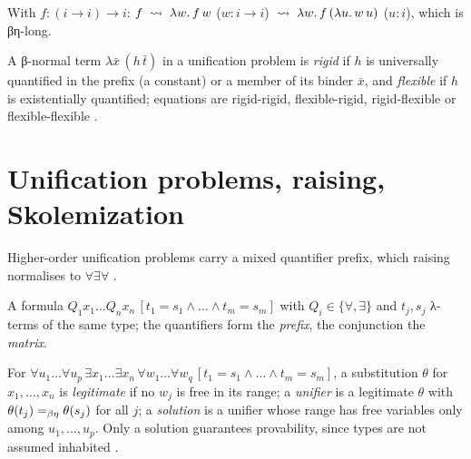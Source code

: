 \begin{example}
With $f:(i\to i)\to i$: $f \;\rightsquigarrow\; \lambda w.\,f\,w$ ($w:i\to i$) $\;\rightsquigarrow\; \lambda w.\,f\,(\lambda u.\,w\,u)$ ($u:i$), which is βη-long.
\end{example}

\begin{definition}\label{def:rules-rigid}
A β-normal term $\lambda\bar x\,(h\,\bar t)$ in a unification problem is \emph{rigid} if $h$ is universally quantified in the prefix (a constant) or a member of its binder $\bar x$, and \emph{flexible} if $h$ is existentially quantified; equations are rigid-rigid, flexible-rigid, rigid-flexible or flexible-flexible .
\end{definition}

\section{Unification problems, raising, Skolemization}\label{sec:rules-raising}

Higher-order unification problems carry a mixed quantifier prefix, which raising normalises to $\forall\exists\forall$ .

\begin{definition}\label{def:rules-problem}
A formula $Q_1x_1\dots\allowbreak Q_nx_n\,\allowbreak[t_1=s_1\wedge\dots\wedge t_m=s_m]$ with $Q_i\in\{\forall,\exists\}$ and $t_j,s_j$ λ-terms of the same type; the quantifiers form the \emph{prefix}, the conjunction the \emph{matrix}.
\end{definition}

\begin{definition}\label{def:rules-solution}
For $\forall u_1\dots\forall u_p\,\allowbreak\exists x_1\dots\exists x_n\,\allowbreak\forall w_1\dots\forall w_q\,\allowbreak[t_1=s_1\wedge\dots\wedge t_m=s_m]$, a substitution $\theta$ for $x_1,\dots,x_n$ is \emph{legitimate} if no $w_j$ is free in its range; a \emph{unifier} is a legitimate $\theta$ with $\theta(t_j)=_{\beta\eta}\theta(s_j)$ for all $j$; a \emph{solution} is a unifier whose range has free variables only among $u_1,\dots,u_p$.
Only a solution guarantees provability, since types are not assumed inhabited .
\end{definition}

